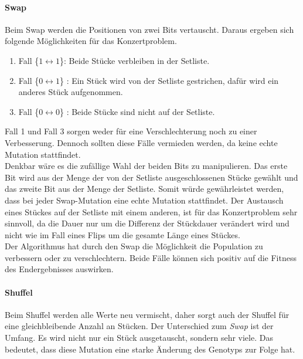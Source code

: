 \paragraph{Swap}
Beim Swap werden die Positionen von zwei Bits vertauscht. 
Daraus ergeben sich folgende Möglichkeiten für das Konzertproblem. 
\begin{enumerate}
    \item Fall \{$1 \longleftrightarrow 1$\}: Beide Stücke verbleiben in der Setliste.
    \item Fall \{$0 \longleftrightarrow 1$\} : Ein Stück wird von der Setliste gestrichen, dafür wird ein anderes Stück aufgenommen.
    \item Fall \{$0 \longleftrightarrow 0$\} : Beide Stücke sind nicht auf der Setliste.
\end{enumerate}

Fall 1 und Fall 3 sorgen weder für eine Verschlechterung noch zu einer Verbesserung. Dennoch sollten diese 
Fälle vermieden werden, da keine echte Mutation stattfindet. \\
Denkbar wäre es die zufällige Wahl der beiden Bits zu manipulieren. Das erste Bit wird aus der Menge der 
von der Setliste ausgeschlossenen Stücke gewählt und das zweite Bit aus der Menge der Setliste. 
Somit würde gewährleistet werden, dass bei jeder Swap-Mutation eine echte Mutation stattfindet. 
Der Austausch eines Stückes auf der Setliste mit einem anderen, ist für das Konzertproblem sehr sinnvoll, 
da die Dauer nur um die Differenz der Stückdauer verändert wird und nicht wie im Fall eines Flips um die gesamte
Länge eines Stückes. \\
Der Algorithmus hat durch den Swap die Möglichkeit die Population zu verbessern oder zu verschlechtern. 
Beide Fälle können sich positiv auf die Fitness des Endergebnisses auswirken. 

\paragraph{Shuffel}
Beim Shuffel werden alle Werte neu vermischt, daher sorgt auch der Shuffel für eine gleichbleibende Anzahl an Stücken.
Der Unterschied zum \emph{Swap} ist der Umfang. Es wird nicht nur ein Stück ausgetauscht, sondern sehr viele. 
Das bedeutet, dass diese Mutation eine starke Änderung des Genotyps zur Folge hat. \\

